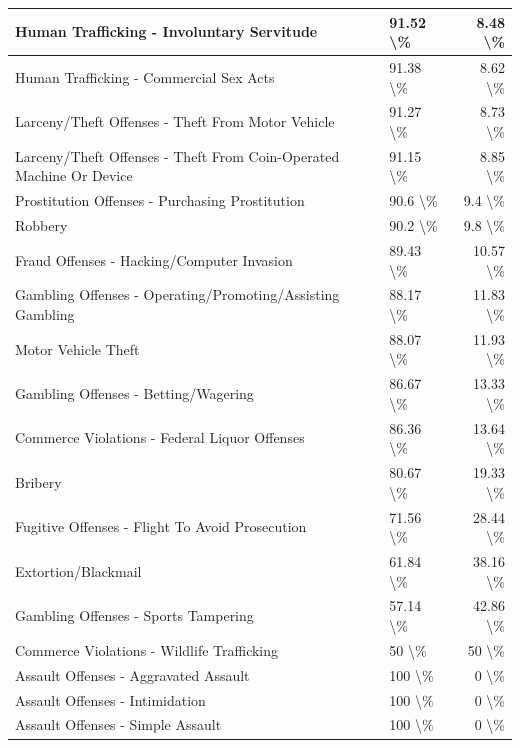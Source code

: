 \documentclass[
]{krantz}
\begin{document}
\begin{longtable}[t]{l|l|r}
\hline
Human Trafficking - Involuntary Servitude & 91.52 \textbackslash{}\% & 8.48 \textbackslash{}\%\\
\hline
Human Trafficking - Commercial Sex Acts & 91.38 \textbackslash{}\% & 8.62 \textbackslash{}\%\\
\hline
Larceny/Theft Offenses - Theft From Motor Vehicle & 91.27 \textbackslash{}\% & 8.73 \textbackslash{}\%\\
\hline
Larceny/Theft Offenses - Theft From Coin-Operated Machine Or Device & 91.15 \textbackslash{}\% & 8.85 \textbackslash{}\%\\
\hline
Prostitution Offenses - Purchasing Prostitution & 90.6 \textbackslash{}\% & 9.4 \textbackslash{}\%\\
\hline
Robbery & 90.2 \textbackslash{}\% & 9.8 \textbackslash{}\%\\
\hline
Fraud Offenses - Hacking/Computer Invasion & 89.43 \textbackslash{}\% & 10.57 \textbackslash{}\%\\
\hline
Gambling Offenses - Operating/Promoting/Assisting Gambling & 88.17 \textbackslash{}\% & 11.83 \textbackslash{}\%\\
\hline
Motor Vehicle Theft & 88.07 \textbackslash{}\% & 11.93 \textbackslash{}\%\\
\hline
Gambling Offenses - Betting/Wagering & 86.67 \textbackslash{}\% & 13.33 \textbackslash{}\%\\
\hline
Commerce Violations - Federal Liquor Offenses & 86.36 \textbackslash{}\% & 13.64 \textbackslash{}\%\\
\hline
Bribery & 80.67 \textbackslash{}\% & 19.33 \textbackslash{}\%\\
\hline
Fugitive Offenses - Flight To Avoid Prosecution & 71.56 \textbackslash{}\% & 28.44 \textbackslash{}\%\\
\hline
Extortion/Blackmail & 61.84 \textbackslash{}\% & 38.16 \textbackslash{}\%\\
\hline
Gambling Offenses - Sports Tampering & 57.14 \textbackslash{}\% & 42.86 \textbackslash{}\%\\
\hline
Commerce Violations - Wildlife Trafficking & 50 \textbackslash{}\% & 50 \textbackslash{}\%\\
\hline
Assault Offenses - Aggravated Assault & 100 \textbackslash{}\% & 0 \textbackslash{}\%\\
\hline
Assault Offenses - Intimidation & 100 \textbackslash{}\% & 0 \textbackslash{}\%\\
\hline
Assault Offenses - Simple Assault & 100 \textbackslash{}\% & 0 \textbackslash{}\%\\

\end{longtable}
\end{document}
